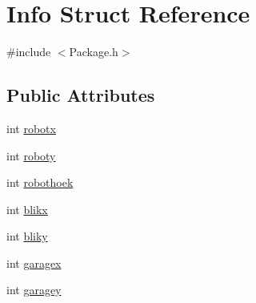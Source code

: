 \hypertarget{structInfo}{\section{Info Struct Reference}
\label{structInfo}
}


{\ttfamily \#include $<$Package.\-h$>$}

\subsection*{Public Attributes}
\begin{DoxyCompactItemize}
\item 
int \hyperlink{structInfo_a61295f0c91f3af22416337bee785a9c2}{robotx}
\item 
int \hyperlink{structInfo_a2dacc6919a0cc7f80da3dc6db7588dd2}{roboty}
\item 
int \hyperlink{structInfo_a452cf47140c5cc9a2bdaf68012abb0dd}{robothoek}
\item 
int \hyperlink{structInfo_ab75b1c67a0eb23774acc62ee53e8d6a9}{blikx}
\item 
int \hyperlink{structInfo_a4abe3b1c4272e0596bd17630baf3eab6}{bliky}
\item 
int \hyperlink{structInfo_a3138ebfa6837af8a395731f1e1cd8f5a}{garagex}
\item 
int \hyperlink{structInfo_a8fffb2565daace7a478fb371d51d8d64}{garagey}
\end{DoxyCompactItemize}


